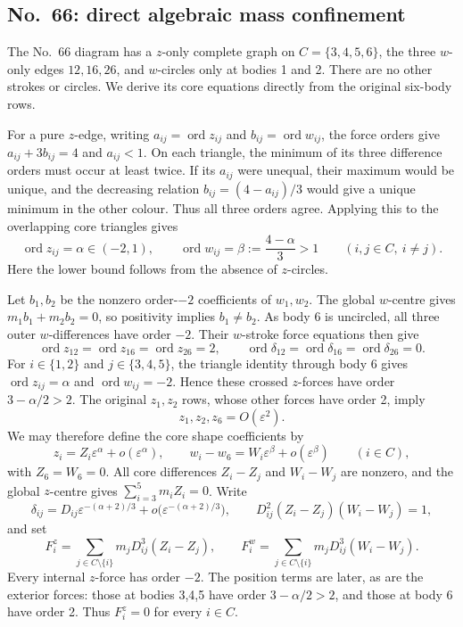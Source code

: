 \documentclass[11pt]{amsart}
\theoremstyle{remark}
\newcommand{\ord}{\operatorname{ord}}
\begin{document}
\subsection{No.~66: direct algebraic mass confinement}
The No.~66 diagram has a $z$-only complete graph on $C=\{3,4,5,6\}$, the three $w$-only edges $12,16,26$, and $w$-circles only at bodies 1 and 2. There are no other strokes or circles. We derive its core equations directly from the original six-body rows.

For a pure $z$-edge, writing $a_{ij}=\ord z_{ij}$ and $b_{ij}=\ord w_{ij}$, the force orders give $a_{ij}+3b_{ij}=4$ and $a_{ij}<1$. On each triangle, the minimum of its three difference orders must occur at least twice. If its $a_{ij}$ were unequal, their maximum would be unique, and the decreasing relation $b_{ij}=(4-a_{ij})/3$ would give a unique minimum in the other colour. Thus all three orders agree. Applying this to the overlapping core triangles gives
\[
\ord z_{ij}=\alpha\in(-2,1),\qquad
\ord w_{ij}=\beta:=\frac{4-\alpha}{3}>1
\qquad(i,j\in C,\ i\ne j).
\]
Here the lower bound follows from the absence of $z$-circles.

Let $b_1,b_2$ be the nonzero order-$-2$ coefficients of $w_1,w_2$. The global $w$-centre gives $m_1b_1+m_2b_2=0$, so positivity implies $b_1\ne b_2$. As body 6 is uncircled, all three outer $w$-differences have order $-2$. Their $w$-stroke force equations then give
\[
\ord z_{12}=\ord z_{16}=\ord z_{26}=2,
\qquad
\ord\delta_{12}=\ord\delta_{16}=\ord\delta_{26}=0.
\]
For $i\in\{1,2\}$ and $j\in\{3,4,5\}$, the triangle identity through body 6 gives $\ord z_{ij}=\alpha$ and $\ord w_{ij}=-2$. Hence these crossed $z$-forces have order $3-\alpha/2>2$. The original $z_1,z_2$ rows, whose other forces have order 2, imply
\[
z_1,z_2,z_6=O(\varepsilon^2).
\]
We may therefore define the core shape coefficients by
\[
z_i=Z_i\varepsilon^\alpha+o(\varepsilon^\alpha),\qquad
w_i-w_6=W_i\varepsilon^\beta+o(\varepsilon^\beta)
\qquad(i\in C),
\]
with $Z_6=W_6=0$. All core differences $Z_i-Z_j$ and $W_i-W_j$ are nonzero, and the global $z$-centre gives $\sum_{i=3}^5m_iZ_i=0$. Write
\[
\delta_{ij}=D_{ij}\varepsilon^{-(\alpha+2)/3}
+o\bigl(\varepsilon^{-(\alpha+2)/3}\bigr),
\qquad D_{ij}^2(Z_i-Z_j)(W_i-W_j)=1,
\]
and set
\[
F_i^z=\sum_{j\in C\setminus\{i\}}m_jD_{ij}^3(Z_i-Z_j),
\qquad
F_i^w=\sum_{j\in C\setminus\{i\}}m_jD_{ij}^3(W_i-W_j).
\]
Every internal $z$-force has order $-2$. The position terms are later, as are the exterior forces: those at bodies 3,4,5 have order $3-\alpha/2>2$, and those at body 6 have order 2. Thus $F_i^z=0$ for every $i\in C$.
\end{document}
